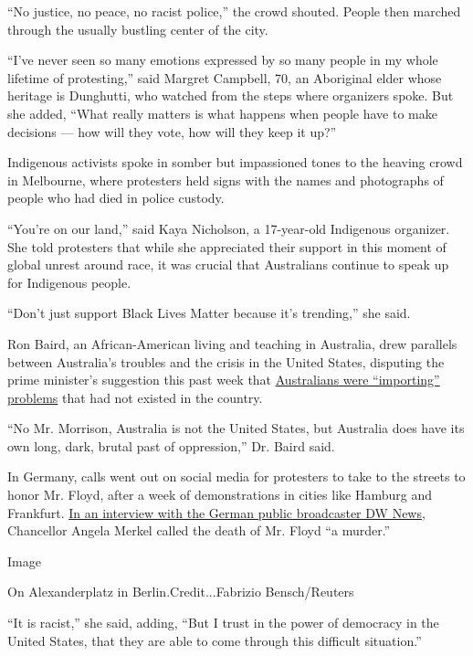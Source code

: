 ``No justice, no peace, no racist police,'' the crowd shouted. People
then marched through the usually bustling center of the city.

``I've never seen so many emotions expressed by so many people in my
whole lifetime of protesting,'' said Margret Campbell, 70, an Aboriginal
elder whose heritage is Dunghutti, who watched from the steps where
organizers spoke. But she added, ``What really matters is what happens
when people have to make decisions --- how will they vote, how will they
keep it up?''

Indigenous activists spoke in somber but impassioned tones to the
heaving crowd in Melbourne, where protesters held signs with the names
and photographs of people who had died in police custody.

``You're on our land,'' said Kaya Nicholson, a 17-year-old Indigenous
organizer. She told protesters that while she appreciated their support
in this moment of global unrest around race, it was crucial that
Australians continue to speak up for Indigenous people.

``Don't just support Black Lives Matter because it's trending,'' she
said.

Ron Baird, an African-American living and teaching in Australia, drew
parallels between Australia's troubles and the crisis in the United
States, disputing the prime minister's suggestion this past week that
\href{https://www.google.com.au/amp/s/amp.theguardian.com/australia-news/2020/jun/04/morrison-says-australia-should-not-import-black-lives-matter-protests-after-deaths-in-custody-rally}{Australians
were ``importing'' problems} that had not existed in the country.

``No Mr. Morrison, Australia is not the United States, but Australia
does have its own long, dark, brutal past of oppression,'' Dr. Baird
said.

In Germany, calls went out on social media for protesters to take to the
streets to honor Mr. Floyd, after a week of demonstrations in cities
like Hamburg and Frankfurt.
\href{https://twitter.com/dwnews/status/1269120077510500353}{In an
interview with the German public broadcaster DW News}, Chancellor Angela
Merkel called the death of Mr. Floyd ``a murder.''

Image

On Alexanderplatz in Berlin.Credit...Fabrizio Bensch/Reuters

``It is racist,'' she said, adding, ``But I trust in the power of
democracy in the United States, that they are able to come through this
difficult situation.''

